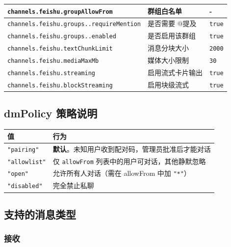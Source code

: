 \begin{table}[h]
\begin{tabular}{|l|l|l|}
\hline
\texttt{channels.feishu.groupAllowFrom} & 群组白名单 & - \\
\hline
\texttt{channels.feishu.groups..requireMention} & 是否需要 @提及 & \texttt{true} \\
\hline
\texttt{channels.feishu.groups..enabled} & 是否启用该群组 & \texttt{true} \\
\hline
\texttt{channels.feishu.textChunkLimit} & 消息分块大小 & \texttt{2000} \\
\hline
\texttt{channels.feishu.mediaMaxMb} & 媒体大小限制 & \texttt{30} \\
\hline
\texttt{channels.feishu.streaming} & 启用流式卡片输出 & \texttt{true} \\
\hline
\texttt{channels.feishu.blockStreaming} & 启用块级流式 & \texttt{true} \\
\hline
\end{tabular}
\end{table}



\hrulefill


\subsection{dmPolicy 策略说明}



\begin{table}[h]
\centering
\small
\begin{tabular}{|l|l|}
\hline
值 & 行为 \\
\hline
\texttt{"pairing"} & \textbf{默认}。未知用户收到配对码，管理员批准后才能对话 \\
\hline
\texttt{"allowlist"} & 仅 \texttt{allowFrom} 列表中的用户可对话，其他静默忽略 \\
\hline
\texttt{"open"} & 允许所有人对话（需在 allowFrom 中加 \texttt{"*"}） \\
\hline
\texttt{"disabled"} & 完全禁止私聊 \\
\hline
\end{tabular}
\end{table}



\hrulefill


\subsection{支持的消息类型}


\subsubsection{接收}


